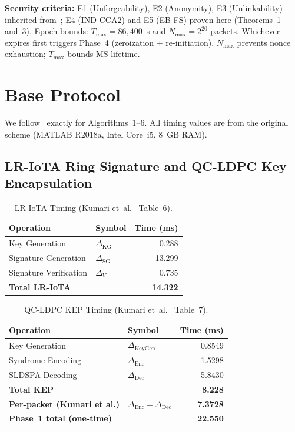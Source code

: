 \documentclass[runningheads]{llncs}
\newcommand{\Nmax}{N_{\max}}
\newcommand{\Tmax}{T_{\max}}
\begin{document}
\textbf{Security criteria:} E1 (Unforgeability), E2 (Anonymity), E3 (Unlinkability)
inherited from~\cite{kumari2022}; E4 (IND-CCA2) and E5 (EB-FS) proven here
(Theorems~1 and~3). Epoch bounds: $\Tmax = 86{,}400$~s and $\Nmax = 2^{20}$
packets. Whichever expires first triggers Phase~4 (zeroization + re-initiation).
$\Nmax$ prevents nonce exhaustion; $\Tmax$ bounds MS lifetime.

\section{Base Protocol}
\label{sec:base}

We follow~\cite{kumari2022} exactly for Algorithms~1--6. All timing values are
from the original scheme (MATLAB R2018a, Intel Core~i5, 8~GB RAM).

\subsection{LR-IoTA Ring Signature and QC-LDPC Key Encapsulation}

\begin{table}[t]
\caption{LR-IoTA Timing (Kumari et~al.~\cite{kumari2022} Table~6).}
\label{tab:lriota}
\centering
\begin{tabular}{|l|l|r|}
\hline
\textbf{Operation} & \textbf{Symbol} & \textbf{Time (ms)} \\
\hline
Key Generation & $\Delta_{\mathrm{KG}}$ & 0.288 \\
Signature Generation & $\Delta_{\mathrm{SG}}$ & 13.299 \\
Signature Verification & $\Delta_V$ & 0.735 \\
\hline
\textbf{Total LR-IoTA} & & \textbf{14.322} \\
\hline
\end{tabular}
\end{table}

\begin{table}[t]
\caption{QC-LDPC KEP Timing (Kumari et~al.~\cite{kumari2022} Table~7).}
\label{tab:qcldpc}
\centering
\begin{tabular}{|l|l|r|}
\hline
\textbf{Operation} & \textbf{Symbol} & \textbf{Time (ms)} \\
\hline
Key Generation & $\Delta_{\mathrm{KeyGen}}$ & 0.8549 \\
Syndrome Encoding & $\Delta_{\mathrm{Enc}}$ & 1.5298 \\
SLDSPA Decoding & $\Delta_{\mathrm{Dec}}$ & 5.8430 \\
\hline
\textbf{Total KEP} & & \textbf{8.228} \\
\textbf{Per-packet (Kumari et al.)} & $\Delta_{\mathrm{Enc}}+\Delta_{\mathrm{Dec}}$ & \textbf{7.3728} \\
\textbf{Phase~1 total (one-time)} & & \textbf{22.550} \\
\hline
\end{tabular}
\end{table}
\end{document}
